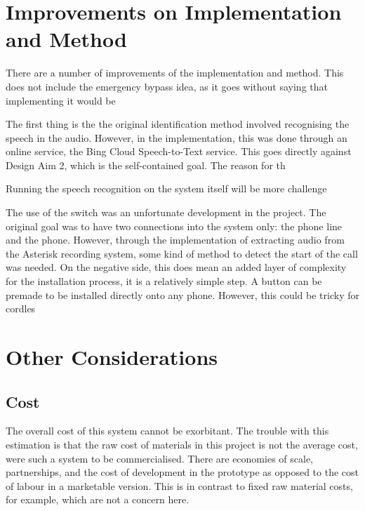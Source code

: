 \documentclass[main.tex]{subfiles}
\begin{document}
\section{Improvements on Implementation and Method}
There are a number of improvements of the implementation and method. This does not include the emergency bypass idea, as it goes without saying that implementing it would be

The first thing is the the original identification method involved recognising the speech in the audio. However, in the implementation, this was done through an online service, the Bing Cloud Speech-to-Text service. This goes directly against Design Aim 2, which is the self-contained goal. The reason for th

Running the speech recognition on the system itself will be more challenge

The use of the switch was an unfortunate development in the project. The original goal was to have two connections into the system only: the phone line and the phone. However, through the implementation of extracting audio from the Asterisk recording system, some kind of method to detect the start of the call was needed. On the negative side, this does mean an added layer of complexity for the installation process, it is a relatively simple step. A button can be premade to be installed directly onto any phone. However, this could be tricky for cordles

\section{Other Considerations}
\subsection{Cost}
The overall cost of this system cannot be exorbitant. The trouble with this estimation is that the raw cost of materials in this project is not the average cost, were such a system to be commercialised. There are economies of scale, partnerships, and the cost of development in the prototype as opposed to the cost of labour in a marketable version. This is in contrast to fixed raw material costs, for example, which are not a concern here.
\end{document}
